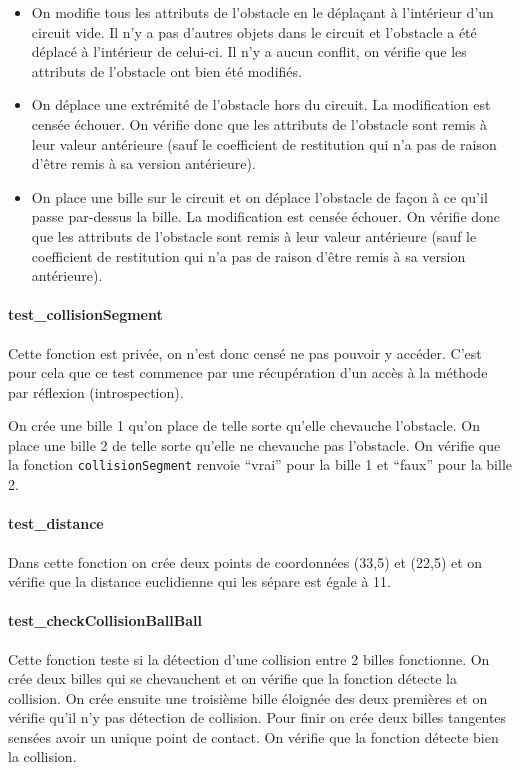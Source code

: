\documentclass{report}
\begin{document}
\begin{itemize}
\item On modifie tous les attributs de l’obstacle en le déplaçant à l’intérieur d’un circuit vide. Il n’y a pas d’autres objets dans le circuit et l’obstacle a été déplacé à l’intérieur de celui-ci. Il n’y a aucun conflit, on vérifie que les attributs de l’obstacle ont bien été modifiés.
\item On déplace une extrémité de l’obstacle hors du circuit. La modification est censée échouer. On vérifie donc que les attributs de l’obstacle sont remis à leur valeur antérieure (sauf le coefficient de restitution qui n’a pas de raison d’être remis à sa version antérieure).
\item On place une bille sur le circuit et on déplace l’obstacle de façon à ce qu’il passe par-dessus la bille. La modification est censée échouer. On vérifie donc que les attributs de l’obstacle sont remis à leur valeur antérieure (sauf le coefficient de restitution qui n’a pas de raison d’être remis à sa version antérieure).
\end{itemize}

\paragraph{test\_collisionSegment}

Cette fonction est privée, on n’est donc censé ne pas pouvoir y accéder. C’est pour cela que ce test  commence par une récupération d’un accès à la méthode par réflexion (introspection). 

On crée une bille 1 qu’on place de telle sorte qu’elle chevauche l’obstacle. On place une bille 2 de telle sorte qu’elle ne chevauche pas l’obstacle. On vérifie que la fonction \texttt{collisionSegment} renvoie “vrai” pour la bille 1 et “faux” pour la bille 2.

\paragraph{test\_distance}

Dans cette fonction on crée deux points de coordonnées (33,5) et (22,5) et on vérifie que la distance euclidienne qui les sépare est égale à 11.

\paragraph{test\_checkCollisionBallBall}

Cette fonction teste si la détection d’une collision entre 2 billes fonctionne. On crée deux billes qui se chevauchent et on vérifie que la fonction détecte la collision. On crée ensuite une troisième bille éloignée des deux premières et on vérifie qu’il n’y pas détection de collision. Pour finir on crée deux billes tangentes sensées avoir un unique point de contact. On vérifie que la fonction détecte bien la collision.
\end{document}
